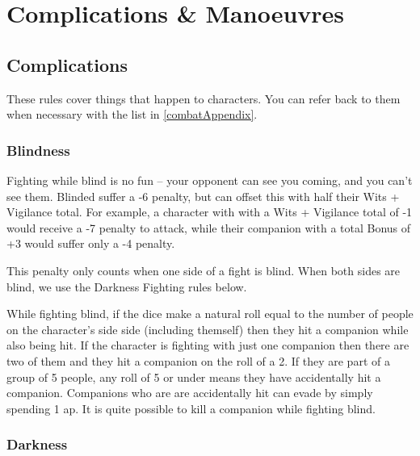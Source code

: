 \startcontents[Manoeuvres]

\section{Complications \& Manoeuvres}

\begin{multicols}{2}

\subsection{Complications}

These rules cover things that happen to characters.
You can refer back to them when necessary with the list in \autoref{combatAppendix}.

\subsubsection[Blindness: Roll at -6 penalty, + (Wits + Vigilance)/ 2]{Blindness}

Fighting while blind is no fun -- your opponent can see you coming, and you can't see them.
Blinded suffer a -6 penalty, but can offset this with half their Wits + Vigilance total.
For example, a character with with a Wits + Vigilance total of -1 would receive a -7 penalty to attack, while their companion with a total Bonus of +3 would suffer only a -4 penalty.

This penalty only counts when one side of a fight is blind. When both sides are blind, we use the Darkness Fighting rules below.

While fighting blind, if the dice make a \gls{natural} roll equal to the number of people on the character's side side (including themself) then they hit a companion while also being hit.
If the character is fighting with just one companion then there are two of them and they hit a companion on the roll of a 2.
If they are part of a group of 5 people, any roll of 5 or under means they have accidentally hit a companion.
Companions who are are accidentally hit can evade by simply spending 1 \gls{ap}.
It is quite possible to kill a companion while fighting blind.

\subsubsection[Darkness: Penalty equals difference between combatants' Wits + Vigilance]{Darkness}
\label{darkness}


\end{multicols}
